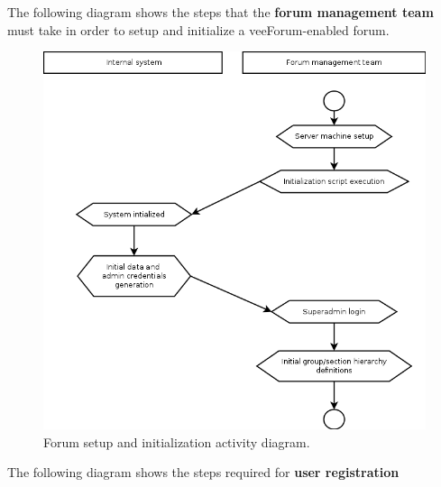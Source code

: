 \documentclass[12pt]{report}
\renewcommand\emph{\textbf}
\begin{document}
                    \newpage

                    The following diagram shows the steps that the \emph{forum management team} must take in order to setup and initialize a veeForum-enabled forum.

                    \begin{figure}[H]
                    \caption{Forum setup and initialization activity diagram.}
                    \centering
                    \includegraphics[width=1\textwidth]{uc/a1}
                    \end{figure}

                    \newpage

                    The following diagram shows the steps required for \emph{user registration}
\end{document}
